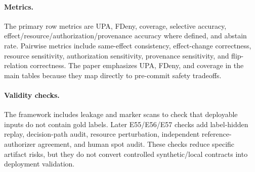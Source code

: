 \paragraph{Metrics.}
The primary row metrics are UPA, FDeny, coverage, selective accuracy, effect/resource/authorization/provenance accuracy where defined, and abstain rate. Pairwise metrics include same-effect consistency, effect-change correctness, resource sensitivity, authorization sensitivity, provenance sensitivity, and flip-relation correctness. The paper emphasizes UPA, FDeny, and coverage in the main tables because they map directly to pre-commit safety tradeoffs.

\paragraph{Validity checks.}
The framework includes leakage and marker scans to check that deployable inputs do not contain gold labels. Later E55/E56/E57 checks add label-hidden replay, decision-path audit, resource perturbation, independent reference-authorizer agreement, and human spot audit. These checks reduce specific artifact risks, but they do not convert controlled synthetic/local contracts into deployment validation.
